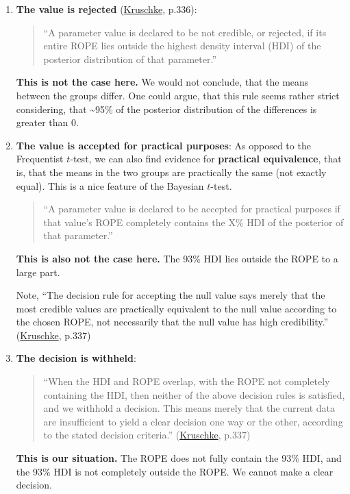 \documentclass[
]{book}
\begin{document}
\begin{enumerate}
\def\labelenumi{\arabic{enumi}.}
\item
  \textbf{The value is rejected} (\href{https://nyu-cdsc.github.io/learningr/assets/kruschke_bayesian_in_R.pdf}{Kruschke}, p.336):

  \begin{quote}
  ``A parameter value is declared to be not credible, or rejected, if its entire ROPE lies outside the highest density interval (HDI) of the posterior distribution of that parameter.''
  \end{quote}

  \textbf{This is not the case here.} We would not conclude, that the means between the groups differ.
  One could argue, that this rule seems rather strict considering, that \textasciitilde95\% of the
  posterior distribution of the differences is greater than 0.
\item
  \textbf{The value is accepted for practical purposes}:
  As opposed to the Frequentist \(t\)-test, we can also find evidence for \textbf{practical equivalence},
  that is, that the means in the two groups are practically the same (not exactly equal).
  This is a nice feature of the Bayesian \(t\)-test.

  \begin{quote}
  ``A parameter value is declared to be accepted for practical purposes if that value's ROPE completely contains the X\% HDI of the posterior of that parameter.''
  \end{quote}

  \textbf{This is also not the case here.} The 93\% HDI lies outside the ROPE to a large part.

  Note, ``The decision rule for accepting the null value says merely that the most credible values are practically equivalent to the null value according to the chosen ROPE, not necessarily that the null value has high credibility.'' (\href{https://nyu-cdsc.github.io/learningr/assets/kruschke_bayesian_in_R.pdf}{Kruschke}, p.337)
\item
  \textbf{The decision is withheld}:

  \begin{quote}
  ``When the HDI and ROPE overlap, with the ROPE not completely containing the HDI, then neither of the above decision rules is satisfied, and we withhold a decision. This means merely that the current data are insufficient to yield a clear decision one way or the other, according to the stated decision criteria.'' (\href{https://nyu-cdsc.github.io/learningr/assets/kruschke_bayesian_in_R.pdf}{Kruschke}, p.337)
  \end{quote}

  \textbf{This is our situation.} The ROPE does not fully contain the 93\% HDI, and the 93\% HDI is not
  completely outside the ROPE. We cannot make a clear decision.
\end{enumerate}
\end{document}
